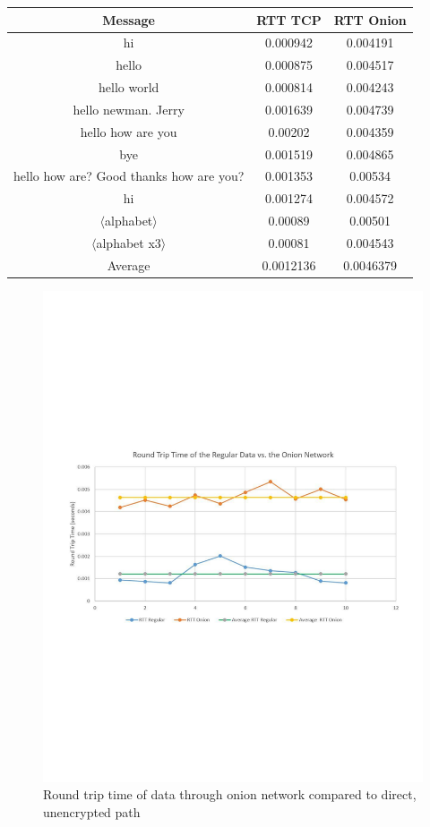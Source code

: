 \documentclass[10pt]{report}
\begin{document}
\begin{center}
    \begin{tabular}{|c|c|c|}
    \hline
    Message & RTT TCP & RTT Onion \\
    \hline
    hi & 0.000942 &    0.004191 \\
    hello &    0.000875 & 0.004517 \\
    hello world & 0.000814 & 0.004243 \\
    hello newman. Jerry & 0.001639 & 0.004739 \\
    hello how are you & 0.00202 & 0.004359 \\
    bye & 0.001519 & 0.004865 \\
    hello how are? Good thanks how are you? & 0.001353 & 0.00534 \\
    hi & 0.001274 & 0.004572 \\
    $\langle$alphabet$\rangle$ & 0.00089 & 0.00501 \\
    $\langle$alphabet x3$\rangle$ & 0.00081 & 0.004543 \\
    \hline
    Average & 0.0012136 & 0.0046379 \\
    \hline
    \end{tabular}
\end{center}
\begin{figure}[H]
	\caption{Round trip time of data through onion network compared to direct, unencrypted path}
	\begin{center}
		\includegraphics[width=\linewidth,trim={0cm 9cm 4cm 9.7cm},clip=true]{timingGraph.pdf}
	\end{center}
\end{figure}
\end{document}
